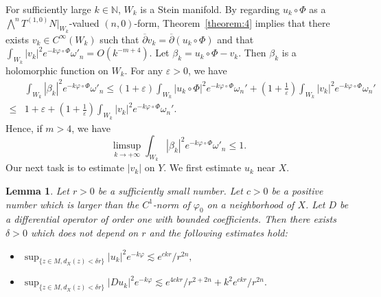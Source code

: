 \documentclass[12pt,oneside]{amsart}
\theoremstyle{plain}
\newtheorem{lemma}{Lemma}
\theoremstyle{definition}
\theoremstyle{remark}
\begin{document}
For sufficiently large $k \in \mathbb{N}$, $W_{k}$ is a Stein manifold.  
By regarding $u_{k} \circ \Phi$ as a $\bigwedge^n T^{(1, 0)}N|_{W_{k}}$-valued $(n, 0)$-form, 
Theorem~\ref{theorem:4} implies that 
there exists $v_{k} \in C^{\infty}(W_{k})$ such that $\overline{\partial}v_{k} = \overline{\partial} (u_{k}\circ \Phi)$ and that $\int_{W_{k}} |v_{k}|^2 e^{-k \varphi \circ \Phi}\omega'_{n} = O(k^{-m+4})$.  
Let $\beta_{k} = u_{k}\circ \Phi -v_{k}$.  
Then $\beta_{k}$ is a holomorphic function on $W_{k}$.  
For any $\varepsilon > 0$, 
we have 
\begin{align*}
& \int_{W_k}|\beta_k|^2 e^{-k\varphi \circ \Phi} \omega'_n \leq (1 + \varepsilon) \int_{W_k}|u_k \circ \Phi|^2e^{-k\varphi \circ \Phi}\omega_n' + \left(1 + \frac{1}{\varepsilon}\right)\int_{W_k} |v_k|^2 e^{-k\varphi \circ \Phi} \omega_n' \\
\leq & 1 + \varepsilon + \left(1 + \frac{1}{\varepsilon}\right)\int_{W_k} |v_k|^2 e^{-k\varphi \circ \Phi} \omega_n'.   
\end{align*}
Hence, if $m > 4$, we have 
\begin{equation}\label{equation:5} 
\limsup_{k \to +\infty}\int_{W_{k}}|\beta_{k}|^2 e^{-k\varphi \circ \Phi} \omega'_{n}  \leq 1.   
\end{equation}
Our next task is to estimate $|v_{k}|$ on $Y$.  
We first estimate $u_{k}$ near $X$.  
\begin{lemma}\label{lemma:5}
Let $r > 0$ be a sufficiently small number.   
Let $c > 0$ be a positive number which is larger than the $C^1$-norm of $\varphi_{0}$ on a neighborhood of $X$.  
Let $D$ be a differential operator of order one with bounded coefficients.  
Then there exists $\delta > 0$ which does not depend on $r$ and the following estimates hold:  
\begin{itemize}
\item[(i)]  
$\sup_{\{z \in M, d_{X}(z) < \delta r\}} |u_{k}|^2 e^{-k\varphi} \lesssim e^{ckr}/r^{2n}, $

\item[(ii)]  
$\sup_{\{z \in M, d_{X}(z) < \delta r\}} |Du_{k}|^2 e^{-k\varphi} \lesssim e^{4ckr}/r^{2+2n} + 
k^2e^{ckr}/r^{2n}.  $

\end{itemize}
\end{lemma}
\end{document}
